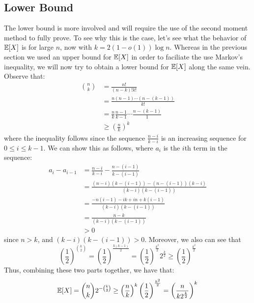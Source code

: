 \documentclass{article}
\begin{document}
\subsection{Lower Bound}
The lower bound is more involved and will require the use of the second moment
method to fully prove. To see why this is the case, let's see what the behavior
of $\mathbb{E}[X]$ is for large $n$, now with $k = 2(1 - o(1)) \log{n}$.
Whereas in the previous section we used an upper bound for $\mathbb{E}[X]$ in order
to faciliate the use Markov's inequality, we will now try to obtain a lower bound for
$\mathbb{E}[X]$ along the same vein. Observe that:
\begin{align*}
    \binom{n}{k} &= \frac{n!}{(n - k)! k!}
    \\
    &= \frac{n(n - 1) \cdots (n - (k - 1))}{k!}
    \\
    &= \frac{n}{k} \frac{n - 1}{k - 1} \cdots \frac{n - (k - 1)}{1}
    \\
    &\geq \left(\frac{n}{k}\right)^{k}
\end{align*}
where the inequality follows since the sequence $\frac{n - i}{k - i}$ is an
increasing sequence for $0 \leq i \leq k - 1$. We can show this as follows, where
$a_{i}$ is the $i$th term in the sequence:
\begin{align*}
    a_{i} - a_{i - 1} &= \frac{n - i}{k - i} - \frac{n - (i - 1)}{k - (i - 1)}
    \\
    &= \frac{(n - i)(k - (i - 1)) - (n - (i - 1))(k - i)}{(k - i)(k - (i - 1))}
    \\
    &= \frac{-n(i - 1) - ik + in + k(i - 1)}{(k - i)(k - (i - 1))}
    \\
    &= \frac{n - k}{(k - i)(k - (i - 1))}
    \\
    &> 0
\end{align*}
since $n > k$, and $(k - i)(k - (i - 1)) > 0$. Moreover, we also can see that
\begin{equation*}
    \left(\frac{1}{2}\right)^{\binom{k}{2}} =
    \left(\frac{1}{2}\right)^{\frac{k(k - 1)}{2}} =
    \left(\frac{1}{2}\right)^{\frac{k^{2}}{2}} 2^{\frac{k}{2}} \geq \left(\frac{1}{2}\right)^{\frac{k^{2}}{2}}
\end{equation*}
Thus, combining these two parts together, we have that:
\begin{equation*}
    \mathbb{E}[X] = \binom{n}{k} 2^{-\binom{k}{2}} \geq
    \left(\frac{n}{k}\right)^{k} \left(\frac{1}{2}\right)^{\frac{k^{2}}{2}} =
    \left(\frac{n}{k 2^{\frac{k}{2}}}\right)^{k}
\end{equation*}
\end{document}
